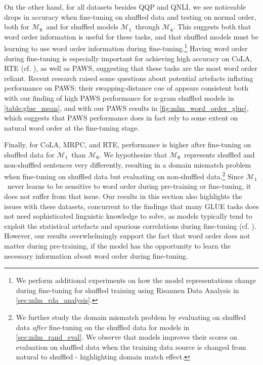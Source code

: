 \documentclass[letterpaper, 12pt]{report}
\newcommand{\OR}{$\mathcal{M}_{\texttt{N}}$}
\newcommand{\RI}{$\mathcal{M}_{\texttt{1}}$}
\newcommand{\RIV}{$\mathcal{M}_{\texttt{4}}$}
\begin{document}
On the other hand, for all datasets besides QQP and QNLI, we see noticeable drops in accuracy when fine-tuning on shuffled data and testing on normal order, both for \OR\ and for shuffled models \RI\ through \RIV.
This suggests both that word order information is useful for these tasks, and that shuffled models must be learning to use word order information during fine-tuning.\footnote{We perform additional experiments on how the model representations change during fine-tuning for shuffled training using Risannen Data Analysis in \autoref{sec:mlm_rda_analysis}.}
Having word order during fine-tuning is especially important for achieving high accuracy on CoLA, RTE (cf. \citealt{pham-etal-2020-out}), as well as PAWS,
suggesting that these tasks are the most word order reliant. Recent research \citep{yu-ettinger-2021-interplay} raised some questions about potential artefacts inflating performance on PAWS: their swapping-distance cue of appears consistent both with our finding of high PAWS performance for n-gram shuffled models in \autoref{table:glue_mean}, and with our PAWS results in \autoref{fig:mlm_word_order_glue}, which suggests that PAWS performance does in fact rely to some extent on natural word order  at the fine-tuning stage.

Finally, for CoLA, MRPC, and RTE, performance is higher after fine-tuning on shuffled data for \RI\ than \OR.
We hypothesize that \OR\ represents shuffled and non-shuffled sentences very differently, resulting in a domain mismatch problem when fine-tuning on shuffled data but evaluating on non-shuffled data.\footnote{We further study the domain mismatch problem by evaluating on shuffled data \textit{after} fine-tuning on the shuffled data for models in \autoref{sec:mlm_rand_eval}. We observe that models improves their scores on evaluation on shuffled data when the training data source is changed from natural to shuffled - highlighting domain match effect.} Since \RI\ never learns to be sensitive to word order during pre-training or fine-tuning, it does not suffer from that issue. Our results in this section also highlights the issues with these datasets, concurrent to the findings that many GLUE tasks does not need sophisticated linguistic knowledge to solve, as models typically tend to exploit the statistical artefacts and spurious correlations during fine-tuning (cf. \citealt{gururangan-etal-2018-annotation, poliak-etal-2018-hypothesis,tsuchiya-2018-performance,mccoy-etal-2019-right}). However, our results overwhelmingly support the fact that word order does not matter during pre-training, if the model has the opportunity to learn the necessary information about word order during fine-tuning.
\end{document}
